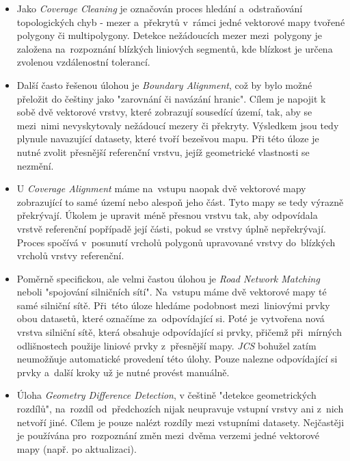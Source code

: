 \begin{itemize}
 \item Jako \textit{Coverage Cleaning} je  označován proces hledání a~odstraňování topologických chyb - mezer a~překrytů v~rámci jedné vektorové mapy tvořené polygony či 
	multipolygony. Detekce nežádoucích mezer mezi~polygony je založena na~rozpoznání blízkých liniových segmentů, kde blízkost je určena zvolenou vzdálenostní tolerancí. 

 \item Další často řešenou úlohou je \textit{Boundary Alignment}, což by bylo možné přeložit do češtiny jako "zarovnání či navázání hranic". Cílem je napojit k sobě dvě 
	vektorové vrstvy, které zobrazují sousedící území, tak, aby se mezi~nimi nevyskytovaly nežádoucí mezery či překryty. Výsledkem jsou tedy plynule navazující datasety,
	které tvoří bezešvou mapu. Při této úloze je nutné zvolit přesnější referenční vrstvu, jejíž geometrické vlastnosti se nezmění.

 \item U \textit{Coverage Alignment} máme na~vstupu naopak dvě vektorové mapy zobrazující to samé území nebo alespoň jeho část. Tyto mapy se tedy výrazně překrývají. Úkolem
	je upravit méně přesnou vrstvu tak, aby odpovídala vrstvě referenční popřípadě její části, pokud se vrstvy úplně nepřekrývají. Proces spočívá v~posunutí vrcholů
	polygonů upravované vrstvy do~blízkých vrcholů vrstvy referenční.

 \item Poměrně specifickou, ale velmi častou úlohou je \textit{Road Network Matching} neboli "spojování silničních sítí". Na~vstupu máme dvě vektorové mapy té samé silniční
	sítě. Při~této úloze hledáme podobnost mezi~liniovými prvky obou datasetů, které označíme za~odpovídající si. Poté je vytvořena nová vrstva silniční sítě, která
	obsahuje odpovídající si prvky, přičemž při~mírných odlišnostech použije liniové prvky z~přesnější mapy. \textit{JCS} bohužel zatím neumožňuje automatické provedení
	této úlohy. Pouze nalezne odpovídající si prvky a~další kroky už je nutné provést manuálně.

\item Úloha \textit{Geometry Difference Detection}, v češtině "detekce geometrických rozdílů", na~rozdíl od~předchozích nijak neupravuje vstupní vrstvy ani z~nich netvoří jiné.
	Cílem je pouze nalézt rozdíly mezi vstupními datasety. Nejčastěji je používána pro~rozpoznání změn mezi~dvěma verzemi jedné vektorové mapy (např. po aktualizaci).
\end{itemize}


